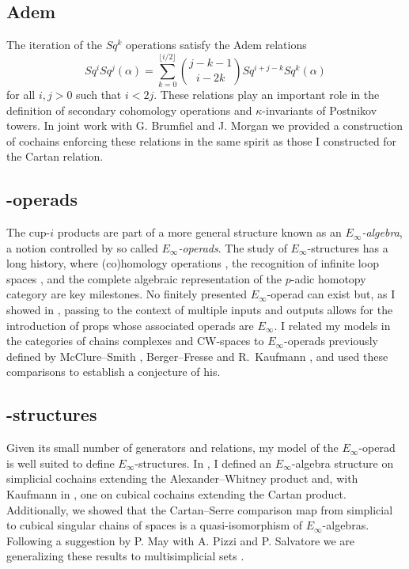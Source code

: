 \subsection{Adem} \label{ss:adem}

The iteration of the $Sq^k$ operations satisfy the Adem relations
\begin{equation*}
Sq^i Sq^j(\alpha) = \sum_{k=0}^{\lfloor i/2 \rfloor} \binom{j-k-1}{i-2k} Sq^{i+j-k} Sq^k(\alpha)
\end{equation*}
for all $i,j > 0$ such that $i < 2j$.
These relations play an important role in the definition of secondary cohomology operations and $\kappa$-invariants of Postnikov towers.
In joint work with G. Brumfiel and J. Morgan \cite{medina2021adem} we provided a construction of cochains enforcing these relations in the same spirit as those I constructed for the Cartan relation.

\subsection{\pdfEinfty-operads}

The cup-$i$ products are part of a more general structure known as an \textit{$E_\infty$-algebra}, a notion controlled by so called \textit{$E_\infty$-operads}.
The study of $E_\infty$-structures has a long history, where (co)homology operations \cite{steenrod1962cohomology, may1970general}, the recognition of infinite loop spaces \cite{boardman1973homotopy, may1972geometry}, and the complete algebraic representation of the $p$-adic homotopy category \cite{mandell2001padic} are key milestones.
No finitely presented $E_\infty$-operad can exist but, as I showed in \cite{medina2020prop1, medina2018prop2}, passing to the context of multiple inputs and outputs allows for the introduction of props whose associated operads are $E_\infty$.
I related my models in the categories of chains complexes and CW-spaces to $E_\infty$-operads previously defined by McClure--Smith \cite{mcclure2003multivariable}, Berger--Fresse \cite{berger2004combinatorial} and R.~Kaufmann \cite{kaufmann2009dimension}, and used these comparisons to establish a conjecture of his.

\subsection{\pdfEinfty-structures} \label{ss:e-infty structures}

Given its small number of generators and relations, my model of the $E_\infty$-operad is well suited to define $E_{\infty}$-structures.
In \cite{medina2020prop1}, I defined an $E_\infty$-algebra structure on simplicial cochains extending the Alexander--Whitney product and, with Kaufmann in \cite{medina2021cubical}, one on cubical cochains extending the Cartan product.
Additionally, we showed that the Cartan--Serre comparison map from simplicial to cubical singular chains of spaces is a quasi-isomorphism of $E_\infty$-algebras.
Following a suggestion by P. May with A. Pizzi and P. Salvatore we are generalizing these results to multisimplicial sets \cite{medina2021multisimplicial}.

